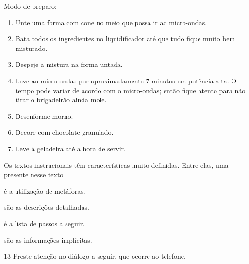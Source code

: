 Modo de preparo:

\begin{enumerate}
\item
  Unte uma forma com cone no meio que possa ir ao micro-ondas.
\item
  Bata todos os ingredientes no liquidificador até que tudo fique muito
  bem misturado.
\item
  Despeje a mistura na forma untada.
\item
  Leve ao micro-ondas por aproximadamente 7 minutos em potência alta. O
  tempo pode variar de acordo com o micro-ondas; então fique atento para
  não tirar o brigadeirão ainda mole.
\item
  Desenforme morno.
\item
  Decore com chocolate granulado.
\item
  Leve à geladeira até a hora de servir.
\end{enumerate}


Os textos instrucionais têm características muito definidas. Entre elas,
uma presente nesse texto

\begin{escolha}
\item é a utilização de metáforas.

\item são as descrições detalhadas.

\item é a lista de passos a seguir.

\item são as informações implícitas.
\end{escolha}

\num{13} Preste atenção no diálogo a seguir, que ocorre ao telefone.

